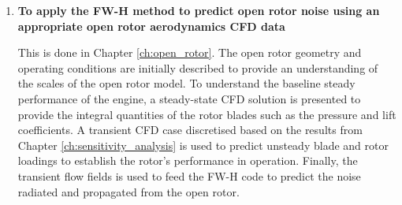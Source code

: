 \begin{enumerate}
    \item \textbf{To apply the FW-H method to predict open rotor noise using an appropriate open rotor aerodynamics CFD data}
    
    This is done in Chapter \ref{ch:open_rotor}. The open rotor geometry and operating conditions are initially described to provide an understanding of the scales of the open rotor model. To understand the baseline steady performance of the engine, a steady-state CFD solution is presented to provide the integral quantities of the rotor blades such as the pressure and lift coefficients. A transient CFD case discretised based on the results from Chapter \ref{ch:sensitivity_analysis} is used to predict unsteady blade and rotor loadings to establish the rotor's performance in operation. Finally, the transient flow fields is used to feed the FW-H code to predict the noise radiated and propagated from the open rotor.
    
\end{enumerate}